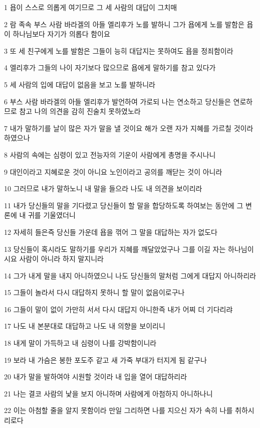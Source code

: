 \par 1 욥이 스스로 의롭게 여기므로 그 세 사람의 대답이 그치매
\par 2 람 족속 부스 사람 바라겔의 아들 엘리후가 노를 발하니 그가 욥에게 노를 발함은 욥이 하나님보다 자기가 의롭다 함이요
\par 3 또 세 친구에게 노를 발함은 그들이 능히 대답지는 못하여도 욥을 정죄함이라
\par 4 엘리후가 그들의 나이 자기보다 많으므로 욥에게 말하기를 참고 있다가
\par 5 세 사람의 입에 대답이 없음을 보고 노를 발하니라
\par 6 부스 사람 바라겔의 아들 엘리후가 발언하여 가로되 나는 연소하고 당신들은 연로하므로 참고 나의 의견을 감히 진술치 못하였노라
\par 7 내가 말하기를 날이 많은 자가 말을 낼 것이요 해가 오랜 자가 지혜를 가르칠 것이라 하였으나
\par 8 사람의 속에는 심령이 있고 전능자의 기운이 사람에게 총명을 주시나니
\par 9 대인이라고 지혜로운 것이 아니요 노인이라고 공의를 깨닫는 것이 아니라
\par 10 그러므로 내가 말하노니 내 말을 들으라 나도 내 의견을 보이리라
\par 11 내가 당신들의 말을 기다렸고 당신들이 할 말을 합당하도록 하여보는 동안에 그 변론에 내 귀를 기울였더니
\par 12 자세히 들은즉 당신들 가운데 욥을 꺾어 그 말을 대답하는 자가 없도다
\par 13 당신들이 혹시라도 말하기를 우리가 지혜를 깨달았었구나 그를 이길 자는 하나님이시요 사람이 아니라 하지 말지니라
\par 14 그가 내게 말을 내지 아니하였으니 나도 당신들의 말처럼 그에게 대답지 아니하리라
\par 15 그들이 놀라서 다시 대답하지 못하니 할 말이 없음이로구나
\par 16 그들이 말이 없이 가만히 서서 다시 대답지 아니한즉 내가 어찌 더 기다리랴
\par 17 나도 내 본분대로 대답하고 나도 내 의향을 보이리니
\par 18 내게 말이 가득하고 내 심령이 나를 강박함이니라
\par 19 보라 내 가슴은 봉한 포도주 같고 새 가죽 부대가 터지게 됨 같구나
\par 20 내가 말을 발하여야 시원할 것이라 내 입을 열어 대답하리라
\par 21 나는 결코 사람의 낯을 보지 아니하며 사람에게 아첨하지 아니하나니
\par 22 이는 아첨할 줄을 알지 못함이라 만일 그리하면 나를 지으신 자가 속히 나를 취하시리로다

